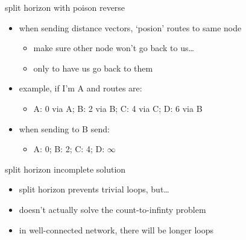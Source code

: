 \begin{frame}{split horizon with poison reverse}
    \begin{itemize}
    \item when sending distance vectors, `posion' routes to same node
        \begin{itemize}
        \item make sure other node won't go back to us\ldots
        \item only to have us go back to them
        \end{itemize}
    \item example, if I'm A and routes are:
        \begin{itemize}
        \item A: 0 via A; B: 2 via B; C: 4 via C; D: 6 via B
        \end{itemize}
    \item when sending to B send:
        \begin{itemize}
        \item A: 0; B: 2; C: 4; D: $\infty$
        \end{itemize}
    \end{itemize}
\end{frame}

\begin{frame}{split horizon incomplete solution}
    \begin{itemize}
    \item split horizon prevents trivial loops, but\ldots
    \item doesn't actually solve the count-to-infinty problem
    \vspace{.5cm}
    \item in well-connected network, there will be longer loops
    \end{itemize}
\end{frame}

